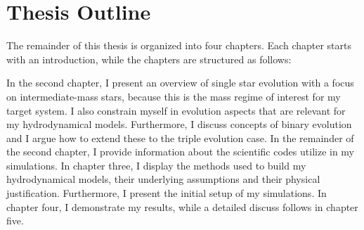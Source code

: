 \section{Thesis Outline}

The remainder of this thesis is organized into four chapters. Each chapter starts with an introduction, while the chapters are structured as follows: 

In the second chapter, I present an overview of single star evolution with a focus on intermediate-mass stars, because this is the mass regime of interest for my target system. I also constrain myself in evolution aspects that are relevant for my hydrodynamical models. Furthermore, I discuss concepts of binary evolution and I argue how to extend these to the triple evolution case. In the remainder of the second chapter, I provide information about the scientific codes utilize in my simulations. In chapter three, I display the methods used to build my hydrodynamical models, their underlying assumptions and their physical justification. Furthermore, I present the initial setup of my simulations. In chapter four, I demonstrate my results, while a detailed discuss follows in chapter five.


